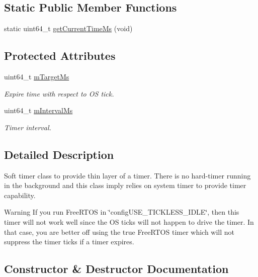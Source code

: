 \subsection*{Static Public Member Functions}
\begin{DoxyCompactItemize}
\item 
static uint64\+\_\+t \hyperlink{classSoftTimer_ad34c4214b548dcc7264a411e0dc9905a}{get\+Current\+Time\+Ms} (void)
\end{DoxyCompactItemize}
\subsection*{Protected Attributes}
{\bf }\par
\begin{DoxyCompactItemize}
\item 
uint64\+\_\+t \hyperlink{classSoftTimer_ad73d26a0b4c48fc39046a66fbd6a303a}{m\+Target\+Ms}
\begin{DoxyCompactList}\small\item\em Expire time with respect to OS tick. \end{DoxyCompactList}\item 
uint64\+\_\+t \hyperlink{classSoftTimer_a6f8355dc6d49b0c9544f2289c700f1a8}{m\+Interval\+Ms}
\begin{DoxyCompactList}\small\item\em Timer interval. \end{DoxyCompactList}\end{DoxyCompactItemize}



\subsection{Detailed Description}
Soft timer class to provide thin layer of a timer. There is no hard-\/timer running in the background and this class imply relies on system timer to provide timer capability.

\begin{DoxyWarning}{Warning}
If you run Free\+R\+T\+OS in \char`\"{}config\+U\+S\+E\+\_\+\+T\+I\+C\+K\+L\+E\+S\+S\+\_\+\+I\+D\+L\+E\char`\"{}, then this timer will not work well since the OS ticks will not happen to drive the timer. In that case, you are better off using the true Free\+R\+T\+OS timer which will not suppress the timer ticks if a timer expires. 
\end{DoxyWarning}


\subsection{Constructor \& Destructor Documentation}
